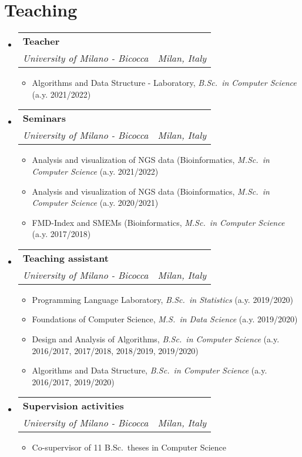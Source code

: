 \documentclass[letterpaper,11pt]{article}
\makeatletter
\newcommand{\resumeItem}[1]{
  \item\small{
    {#1 \vspace{-2pt}}
  }
}
\newcommand{\resumeSubheading}[4]{
  \vspace{-2pt}\item
    \begin{tabular*}{0.97\textwidth}[t]{l@{\extracolsep{\fill}}r}
      \textbf{#1} & #2 \\
      \textit{\small#3} & \textit{\small #4} \\
    \end{tabular*}\vspace{-7pt}
}
\newcommand{\resumeSubHeadingListStart}{\begin{itemize}[leftmargin=0.15in, label={}]}
\newcommand{\resumeSubHeadingListEnd}{\end{itemize}}
\newcommand{\resumeItemListStart}{\begin{itemize}}
\newcommand{\resumeItemListEnd}{\end{itemize}\vspace{-5pt}}
\makeatother
\begin{document}
\section{Teaching}
  \resumeSubHeadingListStart
    \resumeSubheading
      {Teacher}{}
      {University of Milano - Bicocca}{Milan, Italy}
      \resumeItemListStart
        \resumeItem{Algorithms and Data Structure - Laboratory, \textit{B.Sc.~in Computer Science} (a.y. 2021/2022)}
        \resumeItemListEnd
    \resumeSubheading
      {Seminars}{}
      {University of Milano - Bicocca}{Milan, Italy}
      \resumeItemListStart
        \resumeItem{Analysis and visualization of NGS data (Bioinformatics, \textit{M.Sc.~in Computer Science} (a.y. 2021/2022)}
        \resumeItem{Analysis and visualization of NGS data (Bioinformatics, \textit{M.Sc.~in Computer Science} (a.y. 2020/2021)}
        \resumeItem{FMD-Index and SMEMs (Bioinformatics, \textit{M.Sc.~in Computer Science} (a.y. 2017/2018)}
        \resumeItemListEnd
    \resumeSubheading
      {Teaching assistant}{}
      {University of Milano - Bicocca}{Milan, Italy}
      \resumeItemListStart
        \resumeItem{Programming Language Laboratory, \textit{B.Sc.~in Statistics} (a.y. 2019/2020)}
        \resumeItem{Foundations of Computer Science, \textit{M.S.~in Data Science} (a.y. 2019/2020)}
        \resumeItem{Design and Analysis of Algorithms, \textit{B.Sc.~in Computer Science} (a.y. 2016/2017, 2017/2018, 2018/2019, 2019/2020)}
        \resumeItem{Algorithms and Data Structure, \textit{B.Sc.~in Computer Science} (a.y. 2016/2017, 2019/2020)}
      \resumeItemListEnd
    \resumeSubheading
      {Supervision activities}{}
      {University of Milano - Bicocca}{Milan, Italy}
      \resumeItemListStart
        \resumeItem{Co-supervisor of 11 B.Sc.~theses in Computer Science}
      \resumeItemListEnd
  \resumeSubHeadingListEnd
\end{document}
